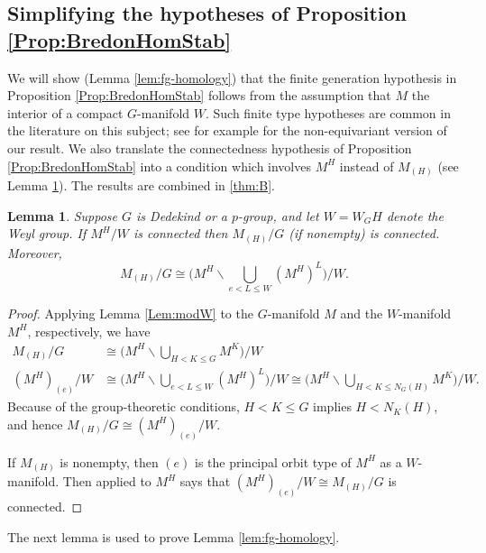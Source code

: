 \documentclass[11pt]{amsart}
\newtheorem{lemma}[equation]{Lemma}
\theoremstyle{definition}
\numberwithin{equation}{subsection} %
\begin{document}
\subsection{Simplifying the hypotheses of Proposition \ref{Prop:BredonHomStab}}
We will show (Lemma \ref{lem:fg-homology}) that the finite generation hypothesis in Proposition
\ref{Prop:BredonHomStab} follows from the assumption that $M$
the interior of a compact $G$-manifold $W$. Such finite type hypotheses are
common in the literature on this subject; see for example \cite{RW13} for the
non-equivariant version of our result. We also translate the connectedness hypothesis of Proposition
\ref{Prop:BredonHomStab} into a condition
which involves $M^H$ instead of $M_{(H)}$ (see Lemma
\ref{lem:hypothesis-translation}). The results are combined in \cref{thm:B}.
\begin{lemma} \label{lem:hypothesis-translation}
Suppose $G$ is Dedekind or a $p$-group, and let $W = W_GH$ denote the Weyl
group. If $M^H/W$ is connected
then $M_{(H)}/G$ (if nonempty) is
connected. Moreover,
$$ M_{(H)}/G \cong \Big(M^H \backslash \bigcup_{e < L \leq W} (M^H)^L\Big)/W. $$
\end{lemma}
\begin{proof}
Applying Lemma \ref{Lem:modW} to the $G$-manifold $M$ and the $W$-manifold
$M^H$, respectively, we have
\begin{align*}
M_{(H)}/G & \cong \Big(M^H \backslash \bigcup_{H<K\leq G} M^K\Big)\big/ W
\\ (M^H)_{(e)}/W & \cong \Big( M^H \backslash \bigcup_{e < L\leq W} (M^H)^L
\Big)\big/ W \cong \Big(M^H\backslash \bigcup_{H < K \leq N_G(H)} M^K\Big)\Big/W.
\end{align*}
Because of the group-theoretic conditions, $H < K \leq G$ implies $H < N_K(H)$, and
hence $M_{(H)}/G\cong (M^H)_{(e)}/W$.

If $M_{(H)}$ is nonempty, then $(e)$ is the principal orbit type of $M^H$ as a
$W$-manifold.
Then \cite[Theorem I.5.14]{tom-dieck-transformation-groups} applied to
$M^H$ says that $(M^H)_{(e)}/W \cong M_{(H)}/G$ is connected.
\end{proof}

The next lemma is used to prove Lemma \ref{lem:fg-homology}.
\end{document}
